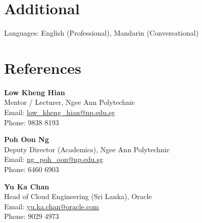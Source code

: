 \documentclass[10pt,a4paper]{article}
\begin{document}
\section*{Additional}
Languages: English (Professional), Mandarin (Conversational)
\section*{References}

\textbf{Low Kheng Hian}\\
Mentor / Lecturer, Ngee Ann Polytechnic\\
Email: \href{mailto:low_kheng_hian@np.edu.sg}{low\_kheng\_hian@np.edu.sg}\\
Phone: 9838 8193

\vspace{6pt}

\textbf{Poh Oon Ng}\\
Deputy Director (Academics), Ngee Ann Polytechnic\\
Email: \href{mailto:ng_poh_oon@np.edu.sg}{ng\_poh\_oon@np.edu.sg}\\
Phone: 6460 6903

\vspace{6pt}

\textbf{Yu Ka Chan}\\
Head of Cloud Engineering (Sri Lanka), Oracle\\
Email: \href{mailto:yu.ka.chan@oracle.com}{yu.ka.chan@oracle.com}\\
Phone: 9029 4973
\end{document}
